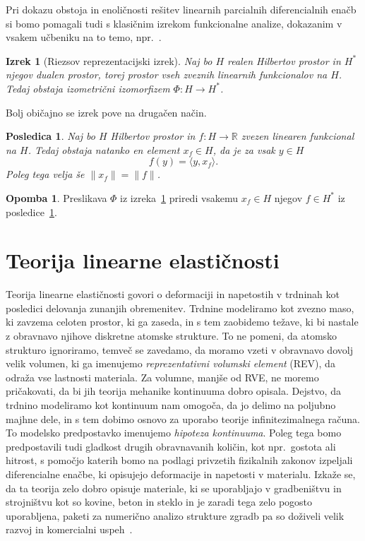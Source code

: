\documentclass[12pt,a4paper,twoside]{article}
\theoremstyle{definition} %
\newtheorem{opomba}[definicija]{Opomba}
\theoremstyle{plain} %
\newtheorem{izrek}[definicija]{Izrek}
\newtheorem{posledica}[definicija]{Posledica}
\numberwithin{equation}{section}
\newcommand{\R}{\mathbb R}
\let\oldsection\section
\def\section{\cleardoublepage\oldsection}
\begin{document}
Pri dokazu obstoja in enoličnosti rešitev linearnih parcialnih diferencialnih enačb si bomo
pomagali tudi s klasičnim izrekom funkcionalne analize, dokazanim v vsakem učbeniku na to temo,
npr.~\cite[str.\ 188, izrek 3.8-1]{kreyszig1989introductory}.
\begin{izrek}[Riezsov reprezentacijski izrek]
  \label{izr:riesz-general}
  Naj bo $H$ realen Hilbertov prostor in $H^\ast$ njegov dualen prostor, torej
  prostor vseh zveznih linearnih funkcionalov na $H$. Tedaj obstaja izometrični
  izomorfizem $\Phi\colon H\to H^\ast$.
\end{izrek}
Bolj običajno se izrek pove na drugačen način.
\begin{posledica}
  \label{izr:riesz-useful}
  Naj bo $H$ Hilbertov prostor in $f\colon H\to\R$ zvezen linearen funkcional na $H$.
  Tedaj obstaja natanko en element $x_f \in H$, da je za vsak $y \in H$
  \begin{equation}
    f(y) = \langle y, x_f \rangle.
  \end{equation}
  Poleg tega velja še $\|x_f\| = \|f\|$.
\end{posledica}
\begin{opomba}
  Preslikava $\Phi$ iz izreka~\ref{izr:riesz-general} priredi vsakemu $x_f \in
  H$ njegov $f \in H^\ast$ iz posledice~\ref{izr:riesz-useful}.
\end{opomba}

\section{Teorija linearne elastičnosti}
\label{sec:mehanika}
Teorija linearne elastičnosti govori o deformaciji in napetostih v trdninah kot posledici delovanja
zunanjih obremenitev. Trdnine modeliramo kot zvezno maso, ki zavzema celoten prostor, ki ga zaseda,
in s tem zaobidemo težave, ki bi nastale z obravnavo njihove diskretne atomske strukture. To ne
pomeni, da atomsko strukturo ignoriramo, temveč se zavedamo, da moramo vzeti v obravnavo dovolj
velik volumen, ki ga imenujemo \emph{reprezentativni volumski element} (REV), da odraža vse
lastnosti materiala. Za volumne, manjše od RVE, ne moremo pričakovati, da bi jih teorija mehanike
kontinuuma dobro opisala. Dejstvo, da trdnino modeliramo kot kontinuum nam omogoča, da jo delimo na
poljubno majhne dele, in s tem dobimo osnovo za uporabo teorije infinitezimalnega računa. To
modelsko predpostavko imenujemo \emph{hipoteza kontinuuma}. Poleg tega bomo predpostavili tudi
gladkost drugih obravnavanih količin, kot npr.~gostota ali hitrost, s pomočjo katerih bomo na
podlagi privzetih fizikalnih zakonov izpeljali diferencialne enačbe, ki opisujejo deformacije in
napetosti v materialu. Izkaže se, da ta teorija zelo dobro opisuje materiale, ki se uporabljajo v
gradbeništvu in strojništvu kot so kovine, beton in steklo in je zaradi tega zelo pogosto
uporabljena, paketi za numerično analizo strukture zgradb pa so doživeli velik razvoj in komercialni
uspeh~\cite{solidworks,hibbitt2001abaqus,autodesk}.
\end{document}
